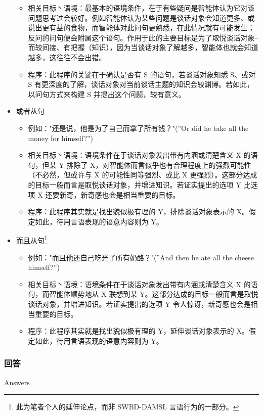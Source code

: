 \begin{itemize}
\begin{itemize}
\item 相关目标丶语境：最基本的语境条件，在于有些疑问是智能体认为它对该问题思考过会较好。例如智能体认为某些问题是谈话对象会知道更多、或说出更有益的食物，而智能体对此问句更熟悉，在此情况就有可能发生；反问的问句便会附属这个语句。作用于此的主要目标是为了取悦谈话对象– 而较间接、有把握（知识），因为当谈话对象了解越多，智能体也就会知道越多，这往往不会出错。 
\item 程序：此程序的关键在于确认是否有 S 的语句，若谈话对象知悉 S、或对 S 有更深度的了解，谈话对象对当前谈话主题的知识会较渊博。若如此，以问句方式来构建 S 并提出这个问题，较有意义。
\end{itemize}
\item 或者从句
\begin{itemize}
\item 例如："还是说，他是为了自己而拿了所有钱？"(”Or did he take all the money for himself?”)
\item 相关目标丶语境：语境条件在于谈话对象发出带有内涵或清楚含义 X 的语句，但某 Y 排除了 X，对智能体而言似乎也有合理程度上的强烈可能性（不必然，但或许与 X 的可能性同等强烈、或比 X 更强烈）。这部分达成的目标一般而言是取悦谈话对象，并增进知识。若证实提出的选项 Y 比选项 X 还要新奇，新奇感也会是相当重要的目标。 
\item 程序：此程序其实就是找出貌似极有理的 Y，排除谈话对象表示的 X。假定如此，待用言语表现的语意内容则为 Y。
\end{itemize}
\item 而且从句\footnote{此为笔者个人的延伸论点，而非 SWBD-DAMSL 言语行为的一部分。}
\begin{itemize}
\item 例如："而且他还自己吃光了所有奶酪？"(”And then he ate all the cheese himself?”)
\item 相关目标丶语境：语境条件在于谈话对象发出带有内涵或清楚含义 X 的语句，而智能体顺势地从 X 联想到某 Y。这部分达成的目标一般而言是取悦谈话对象，并增进知识。若证实提出的选项 Y 令人惊讶，新奇感也会是相当重要的目标。
\item 程序：此程序其实就是找出貌似极有理的 Y，延伸谈话对象表示的 X。假定如此，待用言语表现的语意内容则为 Y。
\end{itemize}
\end{itemize}

\subsubsection{回答}{Answers}

